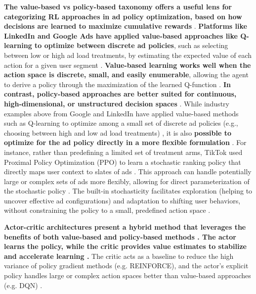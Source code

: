 \documentclass[final]{anthology-ch}         %
\begin{document}
\textbf{The value-based vs policy-based taxonomy offers a useful lens for categorizing RL approaches in ad policy optimization, based on how decisions are learned to maximize cumulative rewards} \cite{Sutton1998, zhao2021dear, lin2023survey}. \textbf{Platforms like LinkedIn and Google Ads have applied value-based approaches like Q-learning to optimize between discrete ad policies}, such as selecting between low or high ad load treatments, by estimating the expected value of each action for a given user segment \cite{mcmahan2013ad, Theocharous-2015, zhao2024survey}. \textbf{Value-based learning works well when the action space is discrete, small, and easily enumerable}, allowing the agent to derive a policy through the maximization of the learned Q-function \cite{Sutton1998, dulac2019challenges}. \textbf{In contrast, policy-based approaches are better suited for continuous, high-dimensional, or unstructured decision spaces} \cite{Sutton1998, dulac2019challenges, schulman2015trust}. While industry examples above from Google and LinkedIn have applied value-based methods such as Q-learning to optimize among a small set of discrete ad policies (e.g., choosing between high and low ad load treatments) \cite{mcmahan2013ad, Theocharous-2015}, it is also \textbf{possible to optimize for the ad policy directly in a more flexible formulation} \cite{Sutton1998, williams1992simple, zhao2021dear}. For instance, rather than predefining a limited set of treatment arms, TikTok used Proximal Policy Optimization (PPO) to learn a stochastic ranking policy that directly maps user context to slates of ads \cite{zhao2021dear, zhao2024survey}. This approach can handle potentially large or complex sets of ads more flexibly, allowing for direct parameterization of the stochastic policy \cite{zhao2021dear, ie2019slateq, dulac2019challenges}. The built-in stochasticity facilitates exploration (helping to uncover effective ad configurations) and adaptation to shifting user behaviors,  without constraining the policy to a small, predefined action space \cite{Sutton1998, williams1992simple, zhao2021dear}.

\textbf{Actor-critic architectures present a hybrid method that leverages the benefits of both value-based and policy-based methods \cite{Sutton1998}. The actor learns the policy, while the critic provides value estimates to stabilize and accelerate learning \cite{Sutton1998, lin2023survey}.} The critic acts as a baseline to reduce the high variance of policy gradient methods (e.g. REINFORCE), and the actor’s explicit policy handles large or complex action spaces better than value-based approaches (e.g. DQN) \cite{chen2022off, mnih2016asynchronous, Sutton1998}.
\end{document}
